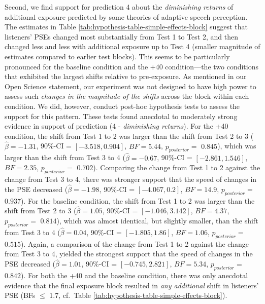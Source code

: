 \documentclass[
  11pt,
  man,mask,floatsintext]{apa6}
\begin{document}
Second, we find support for prediction 4 about the \emph{diminishing returns} of additional exposure predicted by some theories of adaptive speech perception. The estimates in Table \ref{tab:hypothesis-table-simple-effects-block} suggest that listeners' PSEs changed most substantially from Test 1 to Test 2, and then changed less and less with additional exposure up to Test 4 (smaller magnitude of estimates compared to earlier test blocks). This seems to be particularly pronounced for the baseline condition and the +40 condition---the two conditions that exhibited the largest shifts relative to pre-exposure. As mentioned in our Open Science statement, our experiment was not designed to have high power to assess such \emph{changes in the magnitude of the shifts} across the block within each condition. We did, however, conduct post-hoc hypothesis tests to assess the support for this pattern. These tests found anecdotal to moderately strong evidence in support of prediction (4 - \emph{diminishing returns}). For the +40 condition, the shift from Test 1 to 2 was larger than the shift from Test 2 to 3 (\(\hat{\beta} = -1.31\), 90\%-CI = \([-3.518, 0.904]\), \(BF = 5.44\), \(p_{posterior} =\) \(0.845\)), which was larger than the shift from Test 3 to 4 (\(\hat{\beta} = -0.67\), 90\%-CI = \([-2.861, 1.546]\), \(BF = 2.35\), \(p_{posterior} =\) \(0.702\)). Comparing the change from Test 1 to 2 against the change from Test 3 to 4, there was stronger support that the speed of changes in the PSE decreased (\(\hat{\beta} = -1.98\), 90\%-CI = \([-4.067, 0.2]\), \(BF = 14.9\), \(p_{posterior} =\) \(0.937\)). For the baseline condition, the shift from Test 1 to 2 was larger than the shift from Test 2 to 3 (\(\hat{\beta} = 1.05\), 90\%-CI = \([-1.046, 3.142]\), \(BF = 4.37\), \(p_{posterior} =\) \(0.814\)), which was almost identical, but slightly smaller, than the shift from Test 3 to 4 (\(\hat{\beta} = 0.04\), 90\%-CI = \([-1.805, 1.86]\), \(BF = 1.06\), \(p_{posterior} =\) \(0.515\)). Again, a comparison of the change from Test 1 to 2 against the change from Test 3 to 4, yielded the strongest support that the speed of changes in the PSE decreased (\(\hat{\beta} = 1.01\), 90\%-CI = \([-0.745, 2.821]\), \(BF = 5.34\), \(p_{posterior} =\) \(0.842\)). For both the +40 and the baseline condition, there was only anecdotal evidence that the final exposure block resulted in \emph{any additional} shift in listeners' PSE (BFs \(\leq\) 1.7, cf.~Table \ref{tab:hypothesis-table-simple-effects-block}).
\end{document}
